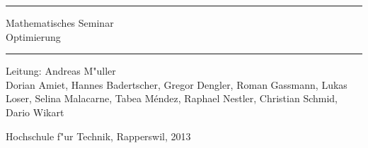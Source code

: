 \documentclass[a4paper,12pt]{book}
\begin{document}
\pagestyle{fancy}
\frontmatter
\newcommand\HRule{\noindent\rule{\linewidth}{1.5pt}}
\begin{titlepage}
\HRule
\vspace*{5pt}
\begin{flushright}
{
\LARGE
Mathematisches Seminar\\
\vspace*{20pt}
\Huge
Optimierung}
\end{flushright}
\HRule
\begin{flushright}
\vspace{60pt}
\Large
Leitung: Andreas M"uller\\
\vspace{40pt}
\Large
Dorian Amiet,
Hannes Badertscher,
Gregor Dengler,
Roman Gassmann,
Lukas Loser,
Selina Malacarne,
Tabea M\'endez,
Raphael Nestler,
Christian Schmid,
Dario Wikart
\end{flushright}


\begin{center}
Hochschule f"ur Technik, Rapperswil, 2013
\end{center}
\end{titlepage}
\hypersetup{
    colorlinks=true,
    linktoc=all,
    linkcolor=blue
}
\newenvironment{beispiele}{
\bgroup\smallskip\parindent0pt\bf Beispiele\egroup

\begin{list}{\arabic{beispiel}.}
  {\usecounter{beispiel}
  \setlength{\labelsep}{5mm}
  \setlength{\rightmargin}{0pt}
}}{\end{list}}

\newenvironment{teilaufgaben}{
\begin{enumerate}
\renewcommand{\labelenumi}{\alph{enumi})}
}{\end{enumerate}}
\def\swallow#1{
}
\newenvironment{loesung}{%
\begin{proof}[L"osung]%
\renewcommand{\qedsymbol}{$\bigcirc$}
}{\end{proof}}
\def\keineloesungen{%
\renewenvironment{loesung}{\swallow\begingroup}{\endgroup}%
}

\newenvironment{beispiel}{%
\begin{proof}[Beispiel]%
\renewcommand{\qedsymbol}{$\bigcirc$}
}{\end{proof}}

\tableofcontents
\newtheorem{satz}{Satz}[chapter]
\newtheorem{hilfssatz}{Hilfssatz}[chapter]
\newtheorem{definition}{Definition}[chapter]
\newtheorem{annahme}{Annahme}[chapter]
\mainmatter

\end{document}
